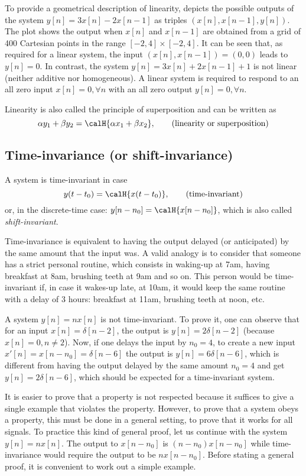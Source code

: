 To provide a geometrical description of linearity,  depicts the possible outputs of the system $y[n]=3x[n]-2x[n-1]$ as triples $(x[n],x[n-1],y[n])$. 
The plot shows the output when $x[n]$ and $x[n-1]$ are obtained from a grid of 400 Cartesian points in the range $[-2,4] \times [-2,4]$. It can be seen that, as required for a linear system, the input $(x[n],x[n-1])=(0,0)$ leads to $y[n]=0$. In contrast, the system $y[n]=3x[n] + 2x[n-1] + 1$ is not linear (neither additive nor homogeneous). A linear system is required to respond to an all zero input $x[n]=0, \forall n$ with an all zero output $y[n]=0, \forall n$. 


Linearity is also called the principle of superposition and can be written as
\[
\alpha y_1 + \beta y_2 = \calH\{\alpha x_1 + \beta x_2\}, \tag{\text{linearity or superposition}}
\]

\subsection{Time-invariance (or shift-invariance)}

A system is time-invariant in case
\[
y(t-t_0) = \calH\{ x(t-t_0) \},\tag{\text{time-invariant}}
\]
or, in the discrete-time case: $y[n-n_0] = \calH\{ x[n-n_0] \}$, which is also called \emph{shift-invariant}.

Time-invariance is equivalent to having the output delayed (or anticipated) by the same amount that the input was. A valid analogy is to consider that someone has a strict personal routine, which consists in waking-up at 7am, having breakfast at 8am, brushing teeth at 9am and so on. This person would be time-invariant if, in case it wakes-up late, at 10am, it would keep the same routine with a delay of 3 hours: breakfast at 11am, brushing teeth at noon, etc.

A system $y[n] = n x[n]$ is not time-invariant. To prove it, one can observe that for an input 
$x[n]=\delta[n-2]$, the output is $y[n]= 2 \delta[n-2]$ (because $x[n]=0, n \ne 2$). Now, if one delays the input by $n_0=4$, to create a new input $x'[n] = x[n-n_0]=\delta[n-6]$ the output is $y[n]=6 \delta[n-6]$, which is different from having the output delayed by the same amount $n_0=4$ and get $y[n]= 2 \delta[n-6]$, which should be expected for a time-invariant system.

It is easier to prove that a property is not respected because it suffices to give a single example that violates the property. However, to prove that a system obeys a property, this must be done in a general setting, to prove that it works for all signals. To practice this kind of general proof, let us continue with the system $y[n] = n x[n]$. The output to $x[n-n_0]$ is $(n-n_0) x[n-n_0]$ while time-invariance would require the output to be $n x[n-n_0]$. Before stating a general proof, it is convenient to work out a simple example.


